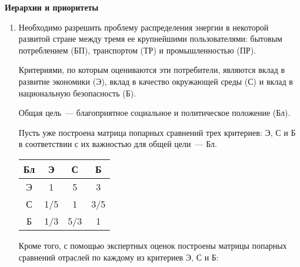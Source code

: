 \documentclass[a4paper,14pt]{extarticle}
\begin{document}
{
\bfseries Иерархии и приоритеты
\par\vspace{1mm}
}
 \begin{enumerate}
 	
    \item  
    Необходимо разрешить проблему распределения энергии в некоторой развитой стране между тремя ее крупнейшими пользователями: бытовым потреблением (БП), транспортом (ТР) и промышленностью (ПР). 
        
    Критериями, по которым оцениваются эти потребители, являются вклад в развитие экономики (Э), вклад в качество окружающей среды (С) и вклад в национальную безопасность (Б). 

    Общая цель~--- благоприятное социальное и политическое положение (Бл). 
    
    Пусть уже построена матрица попарных сравнений трех критериев: Э, С и Б в соответствии с их важностью для общей цели~--- Бл. 
    
    {\centering
    \begin{tabular}{c|ccc}
        Бл & Э   & С   &  Б   \\
        \hline
        Э  & 1   & 5   &  3   \\ 
        С  & 1/5 & 1   &  3/5 \\ 
        Б  & 1/3 & 5/3 &  1   \\
    \end{tabular}
    \par}

    Кроме того, с помощью экспертных оценок построены матрицы попарных сравнений отраслей по каждому из критериев Э, С и Б:


\end{enumerate}
\end{document}
